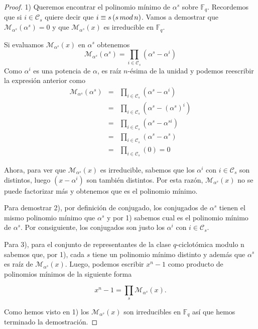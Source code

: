 \begin{proof}
    1) Queremos encontrar el polinomio mínimo de $\alpha^s$ sobre $\mathbb{F}_q$. Recordemos que si $i \in \mathcal{C}_s$ quiere decir que $ i \equiv s \thinspace (s \thinspace mod \thinspace n)$. Vamos a demostrar que $\mathcal{M}_{\alpha^s}(\alpha^s) = 0$ y que $\mathcal{M}_{\alpha^s}(x)$ es irreducible en $\mathbb{F}_q$.

    Si evaluamos $\mathcal{M}_{\alpha^s}(x)$ en $\alpha^s$ obtenemos
    \[ \mathcal{M}_{\alpha^s}(\alpha^s) = \prod_{i \in \mathcal{C}_s} (\alpha^s-\alpha^i)\]
Como $\alpha^i$ es una potencia de $\alpha$, es raíz $n$-ésima de la unidad y podemos reescribir la expresión anterior como 
\begin{eqnarray*}
    \mathcal{M}_{\alpha^s}(\alpha^s) & = & \prod_{i \in \mathcal{C}_s} (\alpha^s-\alpha^i) \\
    & = &  \prod_{i \in \mathcal{C}_s} (\alpha^s-(\alpha^s)^i) \\
    & = &   \prod_{i \in \mathcal{C}_s} (\alpha^s-\alpha^{si}) \\
    & = &  \prod_{i \in \mathcal{C}_s} (\alpha^s-\alpha^s) \\
    & = &  \prod_{i \in \mathcal{C}_s} (0) = 0
\end{eqnarray*}

Ahora, para ver que $\mathcal{M}_{\alpha^s}(x)$ es irreducible, sabemos que los $\alpha^i$ con $ i \in \mathcal{C}_s$ son distintos, luego $(x-\alpha^i)$ son también distintos. Por esta razón, $\mathcal{M}_{\alpha^s}(x)$ no se puede factorizar más y obtenemos que es el polinomio mínimo.

Para demostrar 2), por definición de conjugado, los conjugados de $\alpha^s$ tienen el mismo polinomio mínimo que $\alpha^s$ y por 1) sabemos cual es el polinomio mínimo de $\alpha^s$. Por consiguiente, los conjugados son justo los $\alpha^i$ con $ i \in \mathcal{C}_s$.

Para 3), para el conjunto de representantes de la clase $q$-ciclotómica modulo n sabemos que, por 1), cada $s$ tiene un polinomio mínimo distinto y además que $\alpha^s$ es raíz de $\mathcal{M}_{\alpha^s}(x)$. Luego, podemos escribir $x^n-1$ como producto de polinomios mínimos de la siguiente forma

\[ x^n-1 =  \prod_{s} \mathcal{M}_{\alpha^s}(x) .\]

Como hemos visto en 1) los $\mathcal{M}_{\alpha^s}(x)$ son irreducibles en $\mathbb{F}_q$ así que hemos terminado la demostración.
\end{proof}
